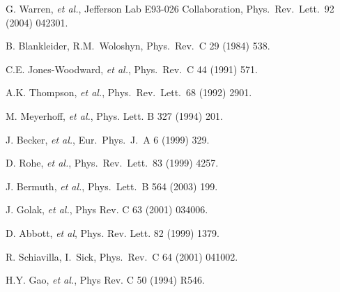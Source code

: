 \begin{thebibliography}{PPV06}
G. Warren, {\it et al.}, Jefferson Lab E93-026 Collaboration,
Phys.\ Rev.\ Lett.\  92 (2004) 042301. 

  B. Blankleider, R.M.~Woloshyn,
  Phys.\ Rev.\ C 29 (1984) 538.

  C.E. Jones-Woodward, {\it et al.},
  Phys.\ Rev.\ C 44 (1991) 571.

A.K. Thompson, {\it et al.},
  Phys.\ Rev.\ Lett.\  68 (1992) 2901.

M. Meyerhoff, {\it et al.}, Phys. Lett. B 327 (1994) 201.

J. Becker, {\it et al.},
Eur.\ Phys.\ J.\ A  6 (1999) 329.

D. Rohe, {\it et al.},
Phys.\ Rev.\ Lett.\  83 (1999) 4257.

J. Bermuth, {\it et al.},
  Phys.\ Lett.\ B 564 (2003) 199.

J. Golak, {\it et al.}, Phys Rev. C 63 (2001) 034006. 

D. Abbott, {\it et al}, Phys. Rev. Lett. 82 (1999) 1379.

R. Schiavilla, I.~Sick,
Phys.\ Rev.\ C 64 (2001) 041002.

H.Y. Gao, {\it et al.}, Phys Rev. C 50 (1994) R546.


\end{thebibliography}
